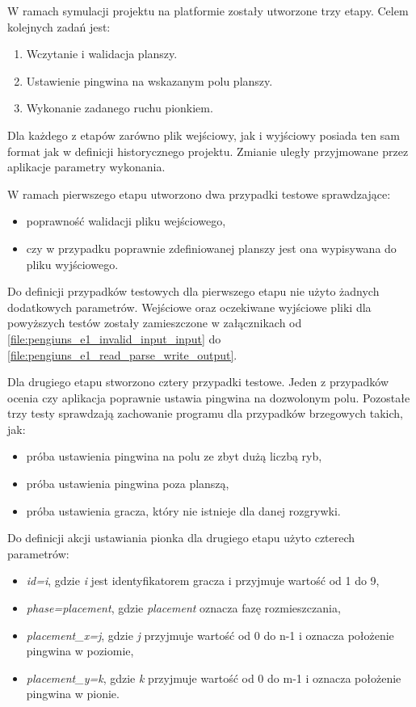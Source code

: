 W ramach symulacji projektu na platformie zostały utworzone trzy etapy.
Celem kolejnych zadań jest:
\begin{enumerate}
    \item Wczytanie i walidacja planszy.
    \item Ustawienie pingwina na wskazanym polu planszy.
    \item Wykonanie zadanego ruchu pionkiem.
\end{enumerate}

Dla każdego z etapów zarówno plik wejściowy, jak i wyjściowy posiada ten sam format jak w definicji historycznego projektu.
Zmianie uległy przyjmowane przez aplikacje parametry wykonania.


W ramach pierwszego etapu utworzono dwa przypadki testowe sprawdzające:
\begin{itemize}
    \item poprawność walidacji pliku wejściowego,
    \item czy w przypadku poprawnie zdefiniowanej planszy jest ona wypisywana do pliku wyjściowego.
\end{itemize}
Do definicji przypadków testowych dla pierwszego etapu nie użyto żadnych dodatkowych parametrów.
Wejściowe oraz oczekiwane wyjściowe pliki dla powyższych testów zostały zamieszczone w załącznikach od \ref{file:pengiuns_e1_invalid_input_input} do \ref{file:pengiuns_e1_read_parse_write_output}.


Dla drugiego etapu stworzono cztery przypadki testowe.
Jeden z przypadków ocenia czy aplikacja poprawnie ustawia pingwina na dozwolonym polu.
Pozostałe trzy testy sprawdzają zachowanie programu dla przypadków brzegowych takich, jak:
\begin{itemize}
    \item próba ustawienia pingwina na polu ze zbyt dużą liczbą ryb,
    \item próba ustawienia pingwina poza planszą,
    \item próba ustawienia gracza, który nie istnieje dla danej rozgrywki.
\end{itemize}

Do definicji akcji ustawiania pionka dla drugiego etapu użyto czterech parametrów:
\begin{itemize}
    \item \textit{id=i}, gdzie \textit{i} jest identyfikatorem gracza i przyjmuje wartość od 1 do 9,
    \item \textit{phase=placement}, gdzie \textit{placement} oznacza fazę rozmieszczania,
    \item \textit{placement\_x=j}, gdzie \textit{j} przyjmuje wartość od 0 do n-1 i oznacza położenie pingwina w poziomie,
    \item \textit{placement\_y=k}, gdzie \textit{k} przyjmuje wartość od 0 do m-1 i oznacza położenie pingwina w pionie.
\end{itemize}

